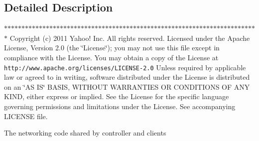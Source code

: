 \subsection{Detailed Description}
$\ast$$\ast$$\ast$$\ast$$\ast$$\ast$$\ast$$\ast$$\ast$$\ast$$\ast$$\ast$$\ast$$\ast$$\ast$$\ast$$\ast$$\ast$$\ast$$\ast$$\ast$$\ast$$\ast$$\ast$$\ast$$\ast$$\ast$$\ast$$\ast$$\ast$$\ast$$\ast$$\ast$$\ast$$\ast$$\ast$$\ast$$\ast$$\ast$$\ast$$\ast$$\ast$$\ast$$\ast$$\ast$$\ast$$\ast$$\ast$$\ast$$\ast$$\ast$$\ast$$\ast$$\ast$$\ast$$\ast$$\ast$$\ast$$\ast$$\ast$$\ast$$\ast$$\ast$$\ast$$\ast$$\ast$$\ast$$\ast$$\ast$$\ast$$\ast$$\ast$$\ast$ Copyright (c) 2011 Yahoo! Inc. All rights reserved. Licensed under the Apache License, Version 2.0 (the \char`\"{}License\char`\"{}); you may not use this file except in compliance with the License. You may obtain a copy of the License at {\tt http://www.apache.org/licenses/LICENSE-\/2.0} Unless required by applicable law or agreed to in writing, software distributed under the License is distributed on an \char`\"{}AS IS\char`\"{} BASIS, WITHOUT WARRANTIES OR CONDITIONS OF ANY KIND, either express or implied. See the License for the specific language governing permissions and limitations under the License. See accompanying LICENSE file.

The networking code shared by controller and clients 